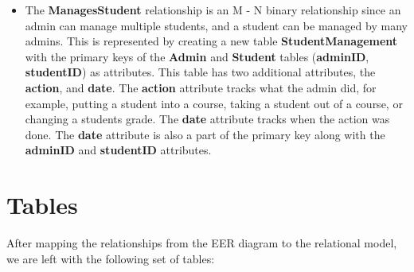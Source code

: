 \documentclass{report}
\newcommand{\usection}[1]{\section*{#1}
\addcontentsline{toc}{section}{\protect\numberline{}#1}}
\begin{document}
\begin{itemize}
\begin{itemize}
        \item The \textbf{ManagesStudent} relationship is an M - N binary relationship since an admin can manage multiple students, and a student can be managed by many admins. This is represented by creating a new table \textbf{StudentManagement} with the primary keys of the \textbf{Admin} and \textbf{Student} tables (\textbf{adminID}, \textbf{studentID}) as attributes. This table has two additional attributes, the \textbf{action}, and \textbf{date}. The \textbf{action} attribute tracks what the admin did, for example, putting a student into a course, taking a student out of a course, or changing a students grade. The \textbf{date} attribute tracks when the action was done. The \textbf{date} attribute is also a part of the primary key along with the \textbf{adminID} and \textbf{studentID} attributes.
    \end{itemize}

\end{itemize}

\usection{Tables}

After mapping the relationships from the EER diagram to the relational model, we are left with the following set of tables:
\end{document}
